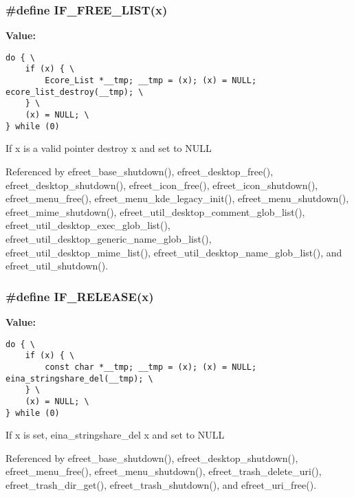 \subsubsection[IF\_\-FREE\_\-LIST]{\setlength{\rightskip}{0pt plus 5cm}\#define IF\_\-FREE\_\-LIST(x)}\label{group__Efreet__Private_gde363b5f0b3fa4175bac51488b44c672}


\textbf{Value:}

\begin{Code}\begin{verbatim}do { \
    if (x) { \
        Ecore_List *__tmp; __tmp = (x); (x) = NULL; ecore_list_destroy(__tmp); \
    } \
    (x) = NULL; \
} while (0)
\end{verbatim}
\end{Code}
If x is a valid pointer destroy x and set to NULL 

Referenced by efreet\_\-base\_\-shutdown(), efreet\_\-desktop\_\-free(), efreet\_\-desktop\_\-shutdown(), efreet\_\-icon\_\-free(), efreet\_\-icon\_\-shutdown(), efreet\_\-menu\_\-free(), efreet\_\-menu\_\-kde\_\-legacy\_\-init(), efreet\_\-menu\_\-shutdown(), efreet\_\-mime\_\-shutdown(), efreet\_\-util\_\-desktop\_\-comment\_\-glob\_\-list(), efreet\_\-util\_\-desktop\_\-exec\_\-glob\_\-list(), efreet\_\-util\_\-desktop\_\-generic\_\-name\_\-glob\_\-list(), efreet\_\-util\_\-desktop\_\-mime\_\-list(), efreet\_\-util\_\-desktop\_\-name\_\-glob\_\-list(), and efreet\_\-util\_\-shutdown().
\subsubsection[IF\_\-RELEASE]{\setlength{\rightskip}{0pt plus 5cm}\#define IF\_\-RELEASE(x)}\label{group__Efreet__Private_g12d3ef74a56458d7f0ae27e00447fe16}


\textbf{Value:}

\begin{Code}\begin{verbatim}do { \
    if (x) { \
        const char *__tmp; __tmp = (x); (x) = NULL; eina_stringshare_del(__tmp); \
    } \
    (x) = NULL; \
} while (0)
\end{verbatim}
\end{Code}
If x is set, eina\_\-stringshare\_\-del x and set to NULL 

Referenced by efreet\_\-base\_\-shutdown(), efreet\_\-desktop\_\-shutdown(), efreet\_\-menu\_\-free(), efreet\_\-menu\_\-shutdown(), efreet\_\-trash\_\-delete\_\-uri(), efreet\_\-trash\_\-dir\_\-get(), efreet\_\-trash\_\-shutdown(), and efreet\_\-uri\_\-free().
